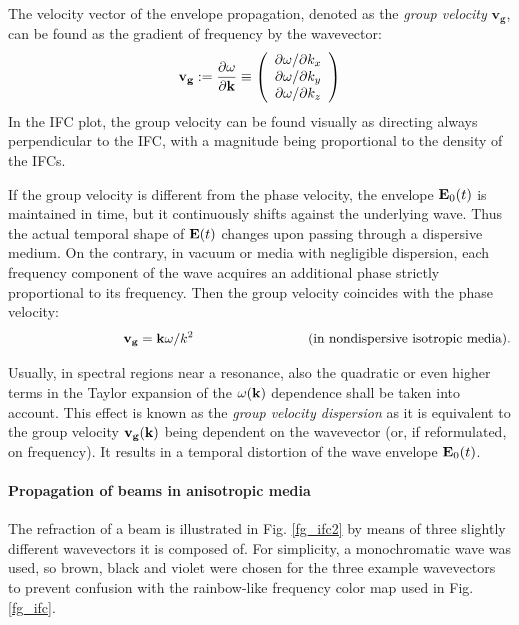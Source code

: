 The velocity vector of the envelope propagation, denoted as the \textit{group velocity} $\mathbf{v_g}$, can be found as the gradient of frequency by the wavevector: %
\begin{equation} \mathbf{v_g} := \frac{\partial \omega}{\partial {\mathbf{k}}} \equiv 
\left(\begin{array}{c} 
	\partial \omega/\partial k_x \\ 
	\partial \omega/\partial k_y \\ 
	\partial \omega/\partial k_z \\ 
	\end{array} \right)
 \label{eq_vg}\end{equation}
In the IFC plot, the group velocity can be found visually as directing always perpendicular to the IFC, with a magnitude being proportional to the density of the IFCs.

If the group velocity is different from the phase velocity, the envelope $\mathbf{E}_0(t)$ is maintained in time, but it continuously shifts against the underlying wave. Thus the actual temporal shape of $\mathbf{E}(t)$ changes upon passing through a dispersive medium.
On the contrary, in vacuum or media with negligible dispersion, each frequency component of the wave acquires an additional phase strictly proportional to its frequency. Then the group velocity coincides with the phase velocity: 
$$\hspace{3cm}\mathbf{v_g} = \kk \omega / k^2 \hspace{3cm} \text{(in nondispersive isotropic media)}.$$

Usually, in spectral regions near a resonance, also the quadratic or even higher terms in the Taylor expansion of the $\omega({\mathbf{k}})$ dependence shall be taken into account. This effect is known as the \textit{group velocity dispersion} as it is equivalent to the group velocity ${\mathbf{v_g}}({\mathbf{k}})$ being dependent on the wavevector (or, if reformulated, on frequency). It results in a temporal distortion of the wave envelope $\mathbf{E}_0(t)$.  %
\paragraph{Propagation of beams in anisotropic media}  %
The refraction of a beam is illustrated in Fig. \ref{fg_ifc2} by means of three slightly different wavevectors it is composed of. For simplicity, a monochromatic wave was used, so brown, black and violet were chosen for the three example wavevectors to prevent confusion with the rainbow-like frequency color map used in Fig. \ref{fg_ifc}. 

